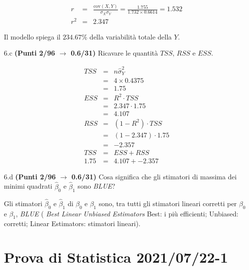 \documentclass[
  11pt,
]{book}
\theoremstyle{mytheoremstyle}
\theoremstyle{mydefstyle}
\newenvironment{sol}
  {
  \begin{tcolorbox}[enhanced,breakable,arc=0.1mm,boxrule=1pt,colback=white,colframe=iblue,
  title=\bf \fontfamily{lmss}\selectfont \hspace{.5 cm} Soluzione,drop fuzzy shadow]

}{
\end{tcolorbox}
  }
\begin{document}
\begin{sol}
\begin{eqnarray*}
r&=&\frac{\text{cov}(X,Y)}{\sigma_X\sigma_Y}=\frac{ 1.755 }{ 1.732 \times 0.6614 }= 1.532 \\ 
r^2&=& 2.347\end{eqnarray*}

Il modello spiega il \(234.67\%\) della variabilità totale della \(Y\).

\end{sol}

6.c \textbf{(Punti 2/96 \(\rightarrow\) 0.6/31)} Ricavare le quantità \(TSS\), \(RSS\) e \(ESS\).

\begin{sol}
\begin{eqnarray*}
   TSS &=& n\hat\sigma^2_Y\\
      &=& 4 \times 0.4375 \\
      &=&  1.75 \\
   ESS &=& R^2\cdot TSS\\
      &=&  2.347 \cdot 1.75 \\
      &=& 4.107 \\
   RSS &=& (1-R^2)\cdot TSS\\
      &=& (1- 2.347 )\cdot 1.75 \\
      &=&  -2.357 \\
   TSS &=& ESS+RSS \\ 1.75  &=&  4.107 + -2.357 
  \end{eqnarray*}

\end{sol}

6.d \textbf{(Punti 2/96 \(\rightarrow\) 0.6/31)} Cosa significa che gli stimatori di massima dei minimi quadrati \(\hat\beta_0\) e \(\hat\beta_1\) sono \emph{BLUE}?

\begin{sol}
Gli stimatori \(\hat\beta_{0}\) e \(\hat\beta_{1}\) di \(\beta_{0}\) e \(\beta_{1}\)
sono, tra tutti gli stimatori lineari corretti per \(\beta_0\) e \(\beta_1\), \emph{BLUE}
( \emph{Best Linear Unbiased Estimators} Best: i più efficienti; Unbiased: corretti;
Linear Estimators: stimatori lineari).

\end{sol}

\section{Prova di Statistica 2021/07/22-1}\label{prova-di-statistica-20210722-1}
\end{document}
